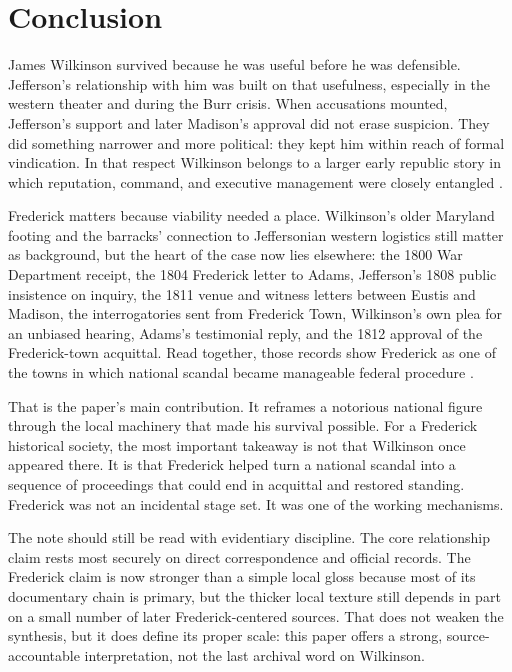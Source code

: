 \section{Conclusion}

James Wilkinson survived because he was useful before he was defensible. Jefferson's relationship with him was built on that usefulness, especially in the western theater and during the Burr crisis. When accusations mounted, Jefferson's support and later Madison's approval did not erase suspicion. They did something narrower and more political: they kept him within reach of formal vindication. In that respect Wilkinson belongs to a larger early republic story in which reputation, command, and executive management were closely entangled \citep{freeman2002,kohn1975,stagg1983}.

Frederick matters because viability needed a place. Wilkinson's older Maryland footing and the barracks' connection to Jeffersonian western logistics still matter as background, but the heart of the case now lies elsewhere: the 1800 War Department receipt, the 1804 Frederick letter to Adams, Jefferson's 1808 public insistence on inquiry, the 1811 venue and witness letters between Eustis and Madison, the interrogatories sent from Frederick Town, Wilkinson's own plea for an unbiased hearing, Adams's testimonial reply, and the 1812 approval of the Frederick-town acquittal. Read together, those records show Frederick as one of the towns in which national scandal became manageable federal procedure \citep{lurie2001}.

That is the paper's main contribution. It reframes a notorious national figure through the local machinery that made his survival possible. For a Frederick historical society, the most important takeaway is not that Wilkinson once appeared there. It is that Frederick helped turn a national scandal into a sequence of proceedings that could end in acquittal and restored standing. Frederick was not an incidental stage set. It was one of the working mechanisms.

The note should still be read with evidentiary discipline. The core relationship claim rests most securely on direct correspondence and official records. The Frederick claim is now stronger than a simple local gloss because most of its documentary chain is primary, but the thicker local texture still depends in part on a small number of later Frederick-centered sources. That does not weaken the synthesis, but it does define its proper scale: this paper offers a strong, source-accountable interpretation, not the last archival word on Wilkinson.

